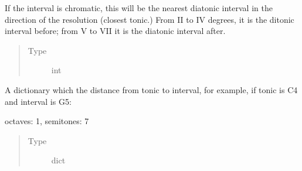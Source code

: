 \documentclass[letterpaper,10pt,english]{sphinxmanual}
\begin{document}
\begin{fulllineitems}
\begin{fulllineitems}
\begin{quote}
\begin{description}
\end{description}\end{quote}

\end{fulllineitems}


\begin{fulllineitems}
\label{\detokenize{birdears:birdears.interval.Interval.diatonic_index}}
If the interval is chromatic, this will be the
nearest diatonic interval in the direction of the resolution
(closest tonic.) From II to IV degrees, it is the ditonic interval
before; from V to VII it is the diatonic interval after.
\begin{quote}\begin{description}
\item[{Type}] \leavevmode
int

\end{description}\end{quote}

\end{fulllineitems}


\begin{fulllineitems}
\label{\detokenize{birdears:birdears.interval.Interval.distance}}
A dictionary which the distance from tonic to
interval, for example, if tonic is C4 and interval is G5:

\begin{sphinxVerbatim}[commandchars=\\\{\}]
\PYGZob{}
    \PYGZsq{}octaves\PYGZsq{}: 1,
    \PYGZsq{}semitones\PYGZsq{}: 7
\PYGZcb{}
\end{sphinxVerbatim}
\begin{quote}\begin{description}
\item[{Type}] \leavevmode
dict

\end{description}\end{quote}

\end{fulllineitems}



\end{fulllineitems}
\end{document}

